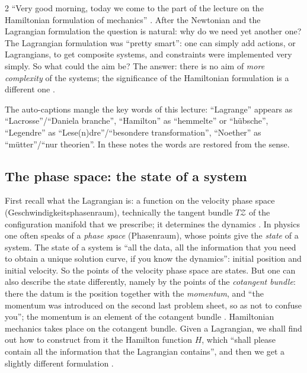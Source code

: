 \begin{paracol}{2}
``Very good morning, today we come to the part of the lecture on the Hamiltonian formulation of mechanics'' . After the Newtonian and the Lagrangian formulation the question is natural: why do we need yet another one? The Lagrangian formulation was ``pretty smart'': one can simply add actions, or Lagrangians, to get composite systems, and constraints were implemented very simply. So what could the aim be? The answer: there is no aim of \emph{more complexity} of the systems; the significance of the Hamiltonian formulation is a different one .

\begin{coursenote}\label{cn:lt-names}
The auto-captions mangle the key words of this lecture: ``Lagrange'' appears as ``Lacrosse''/``Daniela branche'', ``Hamilton'' as ``hemmelte'' or ``hübsche'', ``Legendre'' as ``Lese(n)dre''/``besondere transformation'', ``Noether'' as ``mütter''/``nur theorien''. In these notes the words are restored from the sense.
\end{coursenote}

\subsection{The phase space: the state of a system}\label{ssec:lt-state}

First recall what the Lagrangian is: a function on the velocity phase space (Geschwindigkeitsphasenraum), technically the tangent bundle $T\mathcal Z$ of the configuration manifold that we prescribe; it determines the dynamics . In physics one often speaks of a \emph{phase space} (Phasenraum), whose points give the \emph{state} of a system. The state of a system is ``all the data, all the information that you need to obtain a unique solution curve, if you know the dynamics'': initial position and initial velocity. So the points of the velocity phase space are states. But one can also describe the state differently, namely by the points of the \emph{cotangent bundle}: there the datum is the position together with the \emph{momentum}, and ``the momentum was introduced on the second last problem sheet, so as not to confuse you''; the momentum is an element of the cotangent bundle . Hamiltonian mechanics takes place on the cotangent bundle. Given a Lagrangian, we shall find out how to construct from it the Hamilton function $H$, which ``shall please contain all the information that the Lagrangian contains'', and then we get a slightly different formulation .


\end{paracol}
